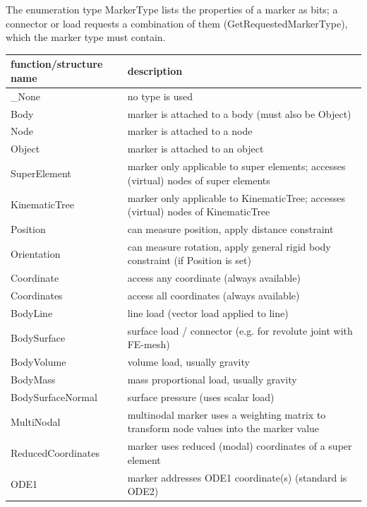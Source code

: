 \label{sec:MarkerType}
The enumeration type MarkerType lists the properties of a marker as bits; a connector or load requests a combination of them (GetRequestedMarkerType), which the marker type must contain.



\begin{center}
\footnotesize
\begin{longtable}{| p{8cm} | p{8cm} |} 
\hline
{\bf function/structure name} & {\bf description}\\ \hline
  \_None & no type is used\\ \hline  
  Body & marker is attached to a body (must also be Object)\\ \hline  
  Node & marker is attached to a node\\ \hline  
  Object & marker is attached to an object\\ \hline  
  SuperElement & marker only applicable to super elements; accesses (virtual) nodes of super elements\\ \hline  
  KinematicTree & marker only applicable to KinematicTree; accesses (virtual) nodes of KinematicTree\\ \hline  
  Position & can measure position, apply distance constraint\\ \hline  
  Orientation & can measure rotation, apply general rigid body constraint (if Position is set)\\ \hline  
  Coordinate & access any coordinate (always available)\\ \hline  
  Coordinates & access all coordinates (always available)\\ \hline  
  BodyLine & line load (vector load applied to line)\\ \hline  
  BodySurface & surface load / connector (e.g. for revolute joint with FE-mesh)\\ \hline  
  BodyVolume & volume load, usually gravity\\ \hline  
  BodyMass & mass proportional load, usually gravity\\ \hline  
  BodySurfaceNormal & surface pressure (uses scalar load)\\ \hline  
  MultiNodal & multinodal marker uses a weighting matrix to transform node values into the marker value\\ \hline  
  ReducedCoordinates & marker uses reduced (modal) coordinates of a super element\\ \hline  
  ODE1 & marker addresses ODE1 coordinate(s) (standard is ODE2)\\ \hline  

\end{longtable}
\end{center}
